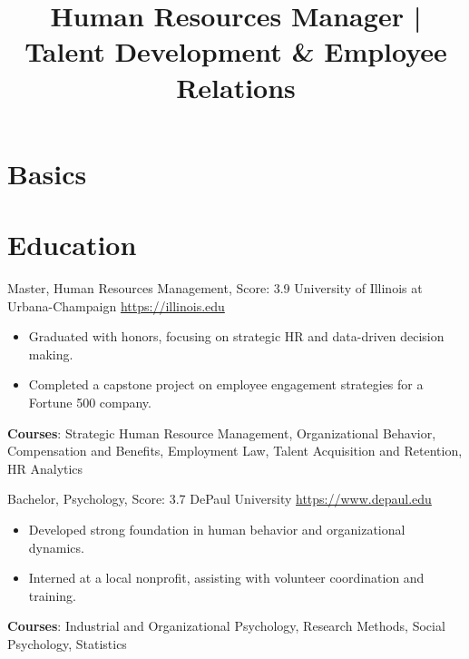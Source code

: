 \documentclass[a4paper, serif, 10pt]{moderncv}
\title{Human Resources Manager | Talent Development \& Employee Relations}
\begin{document}
\maketitle

\section{Basics}

\section{Education}

        {Master, Human Resources Management, Score: 3.9}
        {University of Illinois at Urbana-Champaign}
        {\url{https://illinois.edu}}
        {}
        {\begin{itemize}
\item Graduated with honors, focusing on strategic HR and data-driven decision making.
\item Completed a capstone project on employee engagement strategies for a Fortune 500 company.
\end{itemize}
\textbf{Courses}: Strategic Human Resource Management, Organizational Behavior, Compensation and Benefits, Employment Law, Talent Acquisition and Retention, HR Analytics}

        {Bachelor, Psychology, Score: 3.7}
        {DePaul University}
        {\url{https://www.depaul.edu}}
        {}
        {\begin{itemize}
\item Developed strong foundation in human behavior and organizational dynamics.
\item Interned at a local nonprofit, assisting with volunteer coordination and training.
\end{itemize}
\textbf{Courses}: Industrial and Organizational Psychology, Research Methods, Social Psychology, Statistics}
\end{document}
